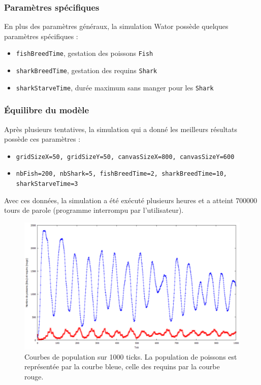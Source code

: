 \documentclass[a4paper]{article}
\begin{document}
\subsubsection{Paramètres spécifiques}

En plus des paramètres généraux, la simulation Wator possède quelques paramètres spécifiques : 
\begin{itemize}
\item \texttt{fishBreedTime}, gestation des poissons \texttt{Fish}
\item \texttt{sharkBreedTime}, gestation des requins \texttt{Shark}
\item \texttt{sharkStarveTime}, durée maximum sans manger pour les \texttt{Shark}
\end{itemize}


\subsubsection{Équilibre du modèle}
Après plusieurs tentatives, la simulation qui a donné les meilleurs résultats possède ces paramètres :
\begin{itemize}
\item \texttt{gridSizeX=50, gridSizeY=50, canvasSizeX=800, canvasSizeY=600}
\item \texttt{nbFish=200, nbShark=5, fishBreedTime=2, sharkBreedTime=10, sharkStarveTime=3}
\end{itemize}

\medskip
Avec ces données, la simulation a été exécuté plusieurs heures et a atteint 700000 tours de parole (programme interrompu par l'utilisateur).

\begin{figure}[!h]
\centering
\includegraphics[width=13cm]{1000tours.png}
\caption{Courbes de population sur 1000 ticks. La population de poissons est représentée par la courbe bleue, celle des requins par la courbe rouge.}
\end{figure}
\newpage
\end{document}
